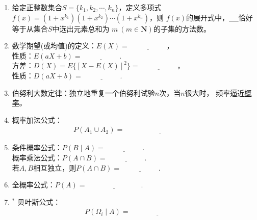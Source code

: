 \documentclass{article}
\newif\ifte
\begin{document}
\begin{multicols}{2}
\begin{enumerate}[leftmargin=20pt]
\item 给定正整数集合$ S=\{k_1,k_2,\cdots,k_n\} $，定义多项式
$ f(x)=(1+x^{k_1})(1+x^{k_2})\cdots (1+x^{k_n}) $，则
$ f(x) $的展开式中，\underline{\ \ifte $ x^m $的系数\else 
\hspace{2cm} \fi\ }恰好等于从集合$ S $中选出元素总和为
$ m\ (m\in \textbf{N}) $的子集的方法数。

\item 数学期望(或均值)的定义：$ E(X)=\underline{\ \ifte 
\sum\limits_{i=1}^{n}x_ip_i \else \hspace{2cm} \fi\ } $，\\ 
性质：$ E(aX+b)=\underline{\ \ifte
aE(X)+b \else \hspace{2cm} \fi\ } $. \\
方差：$ D(X)=E\{[X-E(X)]^2\}=\underline{\ \ifte E(X^2)-[E(X)]^2
\else \hspace{2cm} \fi\ } $，\\ 性质：$ D(aX+b)=\underline{\ \ifte
a^2D(X) \else \hspace{2cm} \fi\ } $. 

\item 伯努利大数定律：独立地重复一个伯努利试验$ n $次，当$ n $很大时，
频率逼近\underline{概率}。

\item 概率加法公式：
\begin{gather*}
    P(A_1\cup A_2)=\underline{\ \ifte 
    P(A_1)+P(A_2)-P(A_1\cap A_2) \else \hspace{4cm} \fi\ }
\end{gather*}

\item 条件概率公式：$ P(B\mid A)=\underline{\ \ifte 
\dfrac{P(A\cap B)}{P(A)}\else \hspace{2cm} \fi\ } $. \\
概率乘法公式：$  P(A\cap B)=\underline{\ \ifte 
    P(A)P(B|A) \else \hspace{2cm} \fi\ } $. \\
若$ A,B $相互独立，则$ P(A\cap B)=\underline{\ \ifte 
    P(A)P(B) \else \hspace{2cm} \fi\ } $.

\item 全概率公式：$ P(A)=\underline{\ \ifte 
\sum\limits_{k=1}^{n} P(A \mid \varOmega_{k}) P(\varOmega_{k})
\else \hspace{3cm} \fi\ } $.

\item $^*$ 贝叶斯公式：
\begin{gather*}
    P(\varOmega_{i} \mid A)=\underline{\ \ifte 
    \dfrac{P(A \mid \varOmega_{i}) 
    P(\varOmega_{i})}{\sum\limits_{k=1}^{n} P(A \mid 
    \varOmega_{k}) P(\varOmega_{k})} \else \hspace{3cm} \fi\ }
\end{gather*}


\end{enumerate}
\end{multicols}
\end{document}
